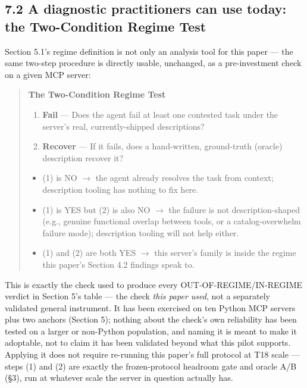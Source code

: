\hypertarget{a-diagnostic-practitioners-can-use-today-the-two-condition-regime-test}{%
\subsection{7.2 A diagnostic practitioners can use today: the
Two-Condition Regime
Test}\label{a-diagnostic-practitioners-can-use-today-the-two-condition-regime-test}}

Section 5.1's regime definition is not only an analysis tool for this
paper --- the same two-step procedure is directly usable, unchanged, as
a pre-investment check on a given MCP server:

\begin{quote}
\textbf{The Two-Condition Regime Test}

\begin{enumerate}
\def\labelenumi{\arabic{enumi}.}
\tightlist
\item
  \textbf{Fail} --- Does the agent fail at least one contested task
  under the server's real, currently-shipped descriptions?
\item
  \textbf{Recover} --- If it fails, does a hand-written, ground-truth
  (oracle) description recover it?
\end{enumerate}

\begin{itemize}
\item
  (1) is NO $\rightarrow$ the agent already resolves the task from context;
  description tooling has nothing to fix here.
\item
  (1) is YES but (2) is also NO $\rightarrow$ the failure is not description-shaped
  (e.g., genuine functional overlap between tools, or a
  catalog-overwhelm failure mode); description tooling will not help
  either.
\item
  (1) and (2) are both YES $\rightarrow$ this server's family is inside the regime
  this paper's Section 4.2 findings speak to.
\end{itemize}
\end{quote}

This is exactly the check used to produce every OUT-OF-REGIME/IN-REGIME
verdict in Section 5's table --- the check \emph{this paper used}, not a
separately validated general instrument. It has been exercised on ten
Python MCP servers plus two anchors (Section 5); nothing about the
check's own reliability has been tested on a larger or non-Python
population, and naming it is meant to make it adoptable, not to claim it
has been validated beyond what this pilot supports. Applying it does not
require re-running this paper's full protocol at T18 scale --- steps (1)
and (2) are exactly the frozen-protocol headroom gate and oracle A/B
(§3), run at whatever scale the server in question actually has.

